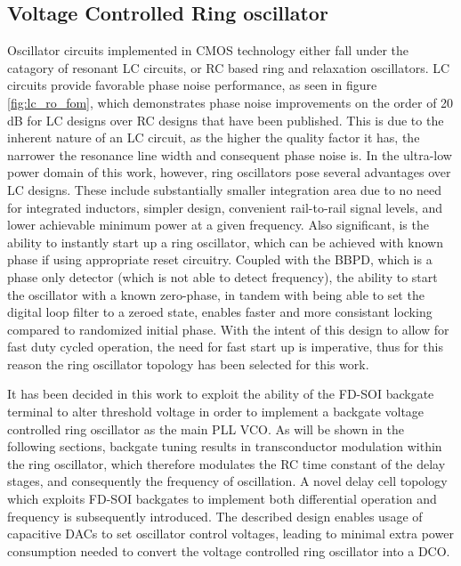 

\FloatBarrier\pagebreak
\subsection{Voltage Controlled Ring oscillator}
	Oscillator circuits implemented in CMOS technology either fall under the catagory of resonant LC circuits, or RC based ring and relaxation oscillators. LC circuits provide favorable phase noise performance, as seen in figure \ref{fig:lc_ro_fom}, which demonstrates phase noise improvements on the order of 20 dB for LC designs over RC designs that have been published. This is due to the inherent nature of an LC circuit, as the higher the quality factor it has, the narrower the resonance line width and consequent phase noise is. In the ultra-low power domain of this work, however, ring oscillators pose several advantages over LC designs. These include substantially smaller integration area due to no need for integrated inductors, simpler design, convenient rail-to-rail signal levels, and lower achievable minimum power at a given frequency. Also significant, is the ability to instantly start up a ring oscillator, which can be achieved with known phase if using appropriate reset circuitry. Coupled with the BBPD, which is a phase only detector (which is not able to detect frequency), the ability to start the oscillator with a known zero-phase, in tandem with being able to set the digital loop filter to a zeroed state, enables faster and more consistant locking compared to randomized initial phase. With the intent of this design to allow for fast duty cycled operation, the need for fast start up is imperative, thus for this reason the ring oscillator topology has been selected for this work. 

	It has been decided in this work to exploit the ability of the FD-SOI backgate terminal to alter threshold voltage in order to implement a backgate voltage controlled ring oscillator as the main PLL VCO. As will be shown in the following sections, backgate tuning results in transconductor modulation within the ring oscillator, which therefore modulates the RC time constant of the delay stages, and consequently the frequency of oscillation. A novel delay cell topology which exploits FD-SOI backgates to implement both differential operation and frequency is subsequently introduced. The described design enables usage of capacitive DACs to set oscillator control voltages, leading to minimal extra power consumption needed to convert the voltage controlled ring oscillator into a DCO. 




